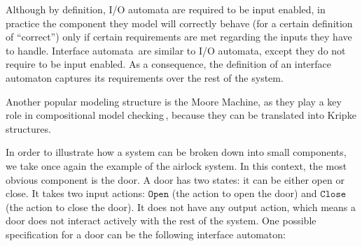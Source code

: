 Although by definition, I/O automata are required to be input enabled, in
practice the component they model will correctly behave (for a certain
definition of ``correct'') only if certain requirements are met regarding the
inputs they have to handle.
%
Interface automata\,\cite{de2001interfaceautomata} are similar to I/O automata,
except they do not require to be input enabled.
%
As a consequence, the definition of an interface automaton captures its
requirements over the rest of the system.

Another popular modeling structure is the Moore Machine, as they play a key role
in compositional model checking\,\cite{mcmillan1989compositional}, because they
can be translated into Kripke structures.

\begin{example}
  \label{example:sota:airlockinterface}

  In order to illustrate how a system can be broken down into small components,
  we take once again the example of the airlock system.
  In this context, the most obvious component is the door.
  A door has two states: it can be either open or close.
  It takes two input actions: \( \mathtt{Open} \) (the action to open the door)
  and \( \mathtt{Close} \) (the action to close the door).
  It does not have any output action, which means a door does not interact
  actively with the rest of the system.
  One possible specification for a door can be the following interface
  automaton:

  \begin{center}
  \end{center}


\end{example}
